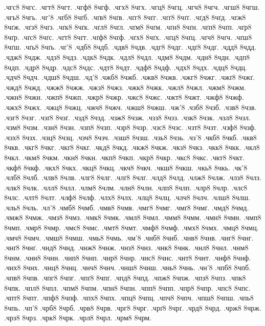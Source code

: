 {.чгс8
8чгс.
.чгт8
8чгт.
.чгф8
8чгф.
.чгх8
8чгх.
.чгц8
8чгц.
.чгч8
8чгч.
.чгш8
8чгш.
.чгь8
8чгь.
.чг'8
.чґб8
8чґб.
.чґв8
8чґв.
.чґг8
8чґг.
.чґґ8
8чґґ.
.чґд8
8чґд.
.чґж8
8чґж.
.чґз8
8чґз.
.чґк8
8чґк.
.чґл8
8чґл.
.чґм8
8чґм.
.чґн8
8чґн.
.чґп8
8чґп.
.чґр8
8чґр.
.чґс8
8чґс.
.чґт8
8чґт.
.чґф8
8чґф.
.чґх8
8чґх.
.чґц8
8чґц.
.чґч8
8чґч.
.чґш8
8чґш.
.чґь8
8чґь.
.чґ'8
.чдб8
8чдб.
.чдв8
8чдв.
.чдг8
8чдг.
.чдґ8
8чдґ.
.чдд8
8чдд.
.чдж8
8чдж.
.чдз8
8чдз.
.чдк8
8чдк.
.чдл8
8чдл.
.чдм8
8чдм.
.чдн8
8чдн.
.чдп8
8чдп.
.чдр8
8чдр.
.чдс8
8чдс.
.чдт8
8чдт.
.чдф8
8чдф.
.чдх8
8чдх.
.чдц8
8чдц.
.чдч8
8чдч.
.чдш8
8чдш.
.чд'8
.чжб8
8чжб.
.чжв8
8чжв.
.чжг8
8чжг.
.чжґ8
8чжґ.
.чжд8
8чжд.
.чжж8
8чжж.
.чжз8
8чжз.
.чжк8
8чжк.
.чжл8
8чжл.
.чжм8
8чжм.
.чжн8
8чжн.
.чжп8
8чжп.
.чжр8
8чжр.
.чжс8
8чжс.
.чжт8
8чжт.
.чжф8
8чжф.
.чжх8
8чжх.
.чжц8
8чжц.
.чжч8
8чжч.
.чжш8
8чжш.
.чж'8
.чзб8
8чзб.
.чзв8
8чзв.
.чзг8
8чзг.
.чзґ8
8чзґ.
.чзд8
8чзд.
.чзж8
8чзж.
.чзз8
8чзз.
.чзк8
8чзк.
.чзл8
8чзл.
.чзм8
8чзм.
.чзн8
8чзн.
.чзп8
8чзп.
.чзр8
8чзр.
.чзс8
8чзс.
.чзт8
8чзт.
.чзф8
8чзф.
.чзх8
8чзх.
.чзц8
8чзц.
.чзч8
8чзч.
.чзш8
8чзш.
.чзь8
8чзь.
.чз'8
.чкб8
8чкб.
.чкв8
8чкв.
.чкг8
8чкг.
.чкґ8
8чкґ.
.чкд8
8чкд.
.чкж8
8чкж.
.чкз8
8чкз.
.чкк8
8чкк.
.чкл8
8чкл.
.чкм8
8чкм.
.чкн8
8чкн.
.чкп8
8чкп.
.чкр8
8чкр.
.чкс8
8чкс.
.чкт8
8чкт.
.чкф8
8чкф.
.чкх8
8чкх.
.чкц8
8чкц.
.чкч8
8чкч.
.чкш8
8чкш.
.чкь8
8чкь.
.чк'8
.члб8
8члб.
.члв8
8члв.
.члг8
8члг.
.члґ8
8члґ.
.члд8
8члд.
.члж8
8члж.
.члз8
8члз.
.члк8
8члк.
.члл8
8члл.
.члм8
8члм.
.члн8
8члн.
.члп8
8члп.
.члр8
8члр.
.члс8
8члс.
.члт8
8члт.
.члф8
8члф.
.члх8
8члх.
.члц8
8члц.
.члч8
8члч.
.члш8
8члш.
.чль8
8чль.
.чл'8
.чмб8
8чмб.
.чмв8
8чмв.
.чмг8
8чмг.
.чмґ8
8чмґ.
.чмд8
8чмд.
.чмж8
8чмж.
.чмз8
8чмз.
.чмк8
8чмк.
.чмл8
8чмл.
.чмм8
8чмм.
.чмн8
8чмн.
.чмп8
8чмп.
.чмр8
8чмр.
.чмс8
8чмс.
.чмт8
8чмт.
.чмф8
8чмф.
.чмх8
8чмх.
.чмц8
8чмц.
.чмч8
8чмч.
.чмш8
8чмш.
.чмь8
8чмь.
.чм'8
.чнб8
8чнб.
.чнв8
8чнв.
.чнг8
8чнг.
.чнґ8
8чнґ.
.чнд8
8чнд.
.чнж8
8чнж.
.чнз8
8чнз.
.чнк8
8чнк.
.чнл8
8чнл.
.чнм8
8чнм.
.чнн8
8чнн.
.чнп8
8чнп.
.чнр8
8чнр.
.чнс8
8чнс.
.чнт8
8чнт.
.чнф8
8чнф.
.чнх8
8чнх.
.чнц8
8чнц.
.чнч8
8чнч.
.чнш8
8чнш.
.чнь8
8чнь.
.чн'8
.чпб8
8чпб.
.чпв8
8чпв.
.чпг8
8чпг.
.чпґ8
8чпґ.
.чпд8
8чпд.
.чпж8
8чпж.
.чпз8
8чпз.
.чпк8
8чпк.
.чпл8
8чпл.
.чпм8
8чпм.
.чпн8
8чпн.
.чпп8
8чпп.
.чпр8
8чпр.
.чпс8
8чпс.
.чпт8
8чпт.
.чпф8
8чпф.
.чпх8
8чпх.
.чпц8
8чпц.
.чпч8
8чпч.
.чпш8
8чпш.
.чпь8
8чпь.
.чп'8
.чрб8
8чрб.
.чрв8
8чрв.
.чрг8
8чрг.
.чрґ8
8чрґ.
.чрд8
8чрд.
.чрж8
8чрж.
.чрз8
8чрз.
.чрк8
8чрк.
.чрл8
8чрл.
.чрм8
8чрм.
}
